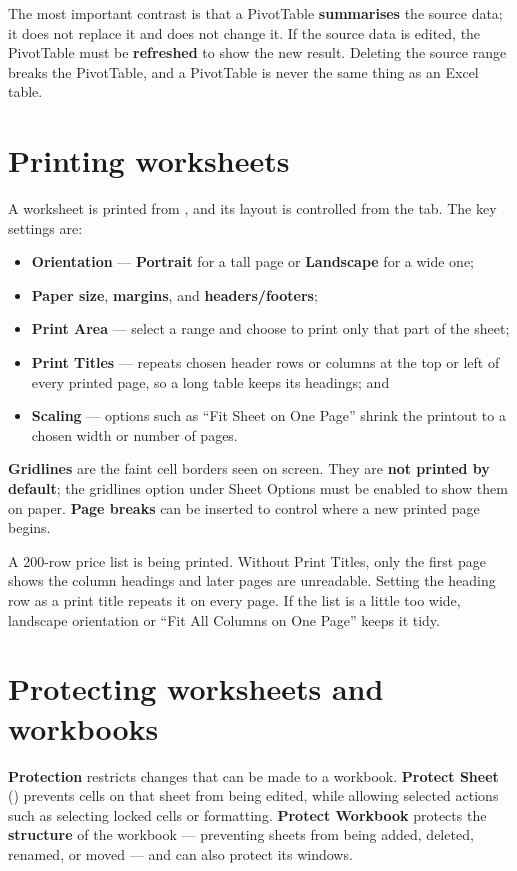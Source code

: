 The most important contrast is that a PivotTable \textbf{summarises} the source
data; it does not replace it and does not change it. If the source data is
edited, the PivotTable must be \textbf{refreshed} to show the new result.
Deleting the source range breaks the PivotTable, and a PivotTable is never the
same thing as an Excel table.

\section{Printing worksheets}
A worksheet is printed from , and its layout is controlled
from the  tab. The key settings are:
\begin{itemize}
  \item \textbf{Orientation} --- \textbf{Portrait} for a tall page or
    \textbf{Landscape} for a wide one;
  \item \textbf{Paper size}, \textbf{margins}, and \textbf{headers/footers};
  \item \textbf{Print Area} --- select a range and choose 
    to print only that part of the sheet;
  \item \textbf{Print Titles} --- repeats chosen header rows or columns at the
    top or left of every printed page, so a long table keeps its headings; and
  \item \textbf{Scaling} --- options such as ``Fit Sheet on One Page'' shrink
    the printout to a chosen width or number of pages.
\end{itemize}
\textbf{Gridlines} are the faint cell borders seen on screen. They are
\textbf{not printed by default}; the  gridlines option under Sheet
Options must be enabled to show them on paper. \textbf{Page breaks} can be
inserted to control where a new printed page begins.

\begin{example}
A 200-row price list is being printed. Without Print Titles, only the first page
shows the column headings and later pages are unreadable. Setting the heading
row as a print title repeats it on every page. If the list is a little too wide,
landscape orientation or ``Fit All Columns on One Page'' keeps it tidy.
\end{example}

\section{Protecting worksheets and workbooks}
\textbf{Protection} restricts changes that can be made to a workbook.
\textbf{Protect Sheet} () prevents cells on that
sheet from being edited, while allowing selected actions such as selecting
locked cells or formatting. \textbf{Protect Workbook} protects the
\textbf{structure} of the workbook --- preventing sheets from being added,
deleted, renamed, or moved --- and can also protect its windows.

